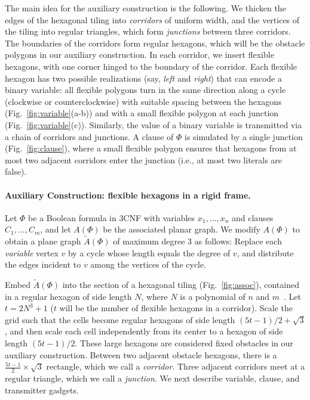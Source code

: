 The main idea for the auxiliary construction is the following. We thicken the edges of the hexagonal tiling into \emph{corridors} of uniform width, and the vertices of the tiling into regular triangles, which form \emph{junctions} between three corridors. The boundaries of the corridors form regular hexagons, which will be the obstacle polygons in our auxiliary construction. In each corridor, we insert flexible hexagons, with one corner hinged to the boundary of the corridor. Each flexible hexagon has two possible realizations (say, \emph{left} and \emph{right}) that can encode a binary variable: all flexible polygons turn in the same direction along a cycle (clockwise or counterclockwise) with suitable spacing between the hexagons (Fig.~\ref{fig:variable}(a-b)) and with a small flexible polygon at each junction (Fig.~\ref{fig:variable}(c)). Similarly, the value of a binary variable is transmitted via a chain of corridors and junctions. A clause of $\Phi$ is simulated by a single junction (Fig.~\ref{fig:clause}), where a small flexible polygon ensures that hexagons from at most two adjacent corridors enter the junction (i.e., at most two literals are false).

\paragraph{Auxiliary Construction: flexible hexagons in a rigid frame.}
Let $\Phi$ be a Boolean formula in 3CNF with variables $x_1,\ldots , x_n$ and clauses $C_1,\ldots ,C_m$, and let $A(\Phi)$ be the associated planar graph. We modify $A(\Phi)$ to obtain a plane graph $\tilde{A}(\Phi)$ of maximum degree 3 as follows: Replace each \emph{variable} vertex $v$ by a cycle whose length equals the degree of $v$, and distribute the edges incident to $v$ among the vertices of the cycle.

Embed $\tilde{A}(\Phi)$ into the section of a hexagonal tiling (Fig.~\ref{fig:assoc}), contained in a regular hexagon of side length $N$, where $N$ is a polynomial of $n$ and $m$~\cite{BK+98}. Let $t=2N^3+1$ ($t$ will be the number of flexible hexagons in a corridor). Scale the grid such that the cells become regular hexagons of side length $(5t-1)/2+\sqrt{3}$, and then scale each cell independently from its center to a hexagon of side length $(5t-1)/2$. These large hexagons are considered fixed obstacles in our auxiliary construction. Between two adjacent obstacle hexagons, there is a $\frac{5t-1}{2}\times \sqrt{3}$ rectangle, which we call a \emph{corridor}. Three adjacent corridors meet at a regular triangle, which we call a \emph{junction}. We next describe variable, clause, and transmitter gadgets.

